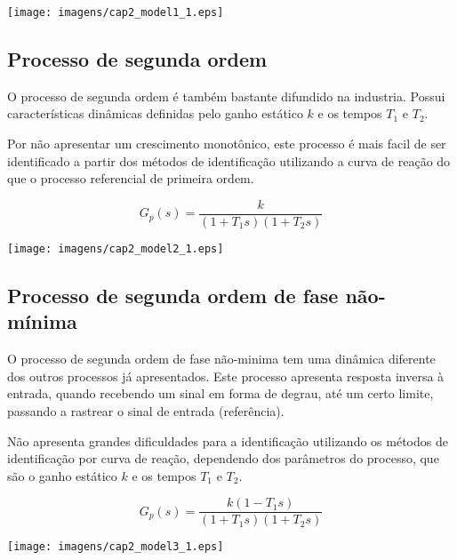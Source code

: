     \begin{center}
        \texttt{[image: imagens/cap2\_model1\_1.eps]}
    \end{center}

\subsection{Processo de segunda ordem}
    
    O processo de segunda ordem é também bastante difundido na industria. Possui
    características dinâmicas definidas pelo ganho estático $k$ e os tempos $T_1$
    e $T_2$.
    
    Por não apresentar um crescimento monotônico, este processo é mais facil de ser
    identificado a partir dos métodos de identificação utilizando a curva de reação
    do que o processo referencial de primeira ordem.
    
    \begin{equation}
        G_p(s) = \frac{k}{(1+T_1 s)(1+T_2 s)}
    \end{equation}
    
    \begin{center}
        \texttt{[image: imagens/cap2\_model2\_1.eps]}
    \end{center}

\subsection{Processo de segunda ordem de fase não-mínima}

    O processo de segunda ordem de fase não-minima tem uma dinâmica diferente dos
    outros processos já apresentados. Este processo apresenta resposta inversa à
    entrada, quando recebendo um sinal em forma de degrau, até um certo limite,
    passando a rastrear o sinal de entrada (referência).
    
    Não apresenta grandes dificuldades para a identificação utilizando os métodos
    de identificação por curva de reação, dependendo dos parâmetros do processo,
    que são o ganho estático $k$ e os tempos $T_1$ e $T_2$.

    \begin{equation}
        G_p(s) = \frac{k(1-T_1 s)}{(1+T_1 s)(1+T_2 s)}
    \end{equation}

    \begin{center}
        \texttt{[image: imagens/cap2\_model3\_1.eps]}
    \end{center}

